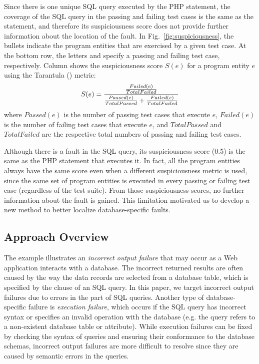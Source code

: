 Since there is one unique SQL query executed by the PHP
 statement, the coverage of the SQL query in the
passing and failing test cases is the same as the 
statement, and therefore its suspiciousness score does not provide
further information about the location of the fault. 
In Fig.~\ref{fig:suspiciousness}, the bullets indicate the program
entities that are exercised by a given test case. At the bottom row,
the letters  and  specify a passing and failing test
case, respectively. Column  shows the suspiciousness score
$S(e)$ for a program entity $e$ using the Tarantula
(\cite{tarantula05}) metric:
\begin{equation}
\small
\label{eq:tarantula}
    S(e) = \dfrac{\tfrac{Failed(e)}{TotalFailed}}{\tfrac{Passed(e)}{TotalPassed} + \tfrac{Failed(e)}{TotalFailed}}
\end{equation}
where $Passed(e)$ is the number of passing test cases that execute
$e$, $Failed(e)$ is the number of failing test cases that execute $e$,
and $TotalPassed$ and $TotalFailed$ are the respective total numbers
of passing and failing test cases.

Although there is a fault in the SQL query, its suspiciousness score
(0.5) is the same as the PHP  statement that
executes it. In fact, all the program entities always have the same
score even when a different suspiciousness metric is used, since the
same set of program entities is executed in every passing or failing
test case (regardless of the test suite). From those suspiciousness
scores,
no further information about the fault is gained. This limitation motivated us
to develop a new
method to better localize database-specific faults.

\subsection{Approach Overview}

The example illustrates an \emph{incorrect output failure} that may
occur as a Web application interacts with a database. The incorrect
returned results are often caused by the way the data records are
selected from a database table, which is specified by the
 clause of an SQL  query. In this paper, we
target incorrect output failures due to errors in the 
part of SQL queries. Another type of database-specific failure is
\emph{execution failure}, which occurs if the SQL query has incorrect
syntax or specifies an invalid operation with the database (e.g. the
query refers to a non-existent database table or attribute). While
execution failures can be fixed by checking the syntax of queries and
ensuring their conformance to the database schemas, incorrect output
failures are more difficult to resolve since they are caused by
semantic errors in the queries.

